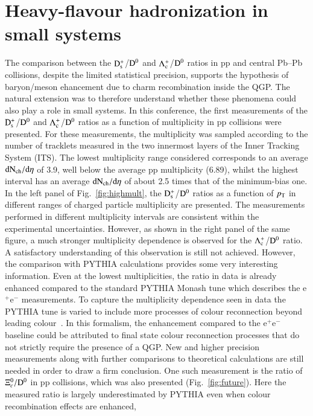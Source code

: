 \documentclass[3p,times,procedia]{elsarticle}
\newcommand{\pt}{p_{\rm T}}
\newcommand{\Dzero}{{\rm D^0}}
\newcommand{\Ds}{{\rm D_{s}^+}}
\newcommand{\Lc}{{\rm \Lambda_{c}^+}}
\begin{document}
\section{Heavy-flavour hadronization in small systems}
\label{recombination}
The comparison between the $\Ds$/$\Dzero$ and $\Lc$/$\Dzero$ ratios in pp and central Pb--Pb collisions, despite the limited statistical precision, 
supports the hypothesis of baryon/meson ehancement due to charm recombination inside the QGP. The natural extension was to therefore
understand whether these phenomena could also play a role in small systems.
In this conference, the first measurements of the $\Ds$/$\Dzero$ and $\Lc$/$\Dzero$ ratios as a function of multiplicity in pp collisions were presented.
For these measurements, the multiplicity was sampled according to the number of tracklets measured in the two innermost layers of the Inner Tracking 
System (ITS). The lowest multiplicity range considered corresponds to an average $\rm dN_{ch}/d\eta$ of 3.9, well below the average pp multiplicity (6.89), whilst 
the highest interval has an average $\rm dN_{ch}/d\eta$ of about 2.5 times that of the minimum-bias one.
In the left panel of Fig.~\ref{fig:highmult}, the $\Ds$/$\Dzero$ ratios as a function of $\pt$ in different ranges of charged particle multiplicity are presented. 
The measurements performed in different multiplicity intervals are consistent within the experimental uncertainties. 
However, as shown in the right panel of the same figure, a much stronger multiplicity dependence is observed 
for the $\Lc$/$\Dzero$ ratio. A satisfactory understanding of this observation is still not achieved.
However, the comparison with PYTHIA calculations provides some very interesting information.
Even at the lowest multiplicities, the ratio in data is already enhanced compared to the standard PYTHIA Monash tune which describes 
the e$^+$e$^-$ measurements. To capture the multiplicity dependence seen in data the PYTHIA tune is varied to include 
more processes of colour reconnection beyond leading colour~\cite{pythia8CR}. In this formalism, 
the enhancement compared to the e$^+$e$^-$ baseline could be attributed to
final state colour reconnection processes that do not strictly require the presence of a QGP. 
New and higher precision measurements along with further comparisons to theoretical calculations are still needed in order to draw a firm conclusion. 
One such measurement is the ratio of $\Xi^{0}_{c}/\Dzero$ in pp collisions, which was also presented (Fig.~\ref{fig:future}). 
Here the measured ratio is largely underestimated by PYTHIA even when colour recombination effects are enhanced,
\end{document}
